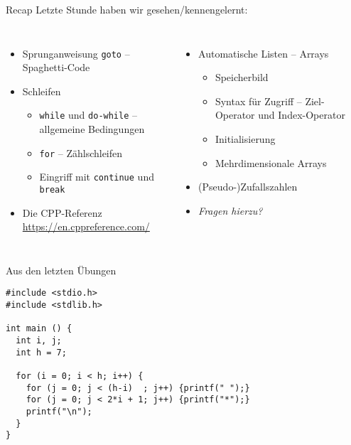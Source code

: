 
\begin{frame}[t,plain]
\titlepage
\end{frame}


\begin{frame}{Recap}
%
Letzte Stunde haben wir gesehen/kennengelernt:
%
\begin{columns}[T]
\begin{itemize}
\item Sprunganweisung \texttt{goto} -- Spaghetti-Code
\item Schleifen
	\begin{itemize}
	\item \texttt{while} und \texttt{do-while} -- allgemeine Bedingungen
	\item \texttt{for} -- Zählschleifen
	\item Eingriff mit \texttt{continue} und \texttt{break}
	\end{itemize}
\item Die CPP-Referenz \url{https://en.cppreference.com/}
\end{itemize}
%
\begin{itemize}
\item Automatische Listen -- Arrays
	\begin{itemize}
	\item Speicherbild
	\item Syntax für Zugriff -- Ziel-Operator und Index-Operator
	\item Initialisierung
	\item Mehrdimensionale Arrays
	\end{itemize}
\item (Pseudo-)Zufallszahlen
\item \emph{Fragen hierzu?}
\end{itemize}
\end{columns}
%
\end{frame}


\begin{frame}[fragile]{Aus den letzten Übungen}
%
\begin{codebox}
\begin{verbatim}
#include <stdio.h>
#include <stdlib.h>

int main () {
  int i, j;
  int h = 7;
  
  for (i = 0; i < h; i++) {
    for (j = 0; j < (h-i)  ; j++) {printf(" ");}
    for (j = 0; j < 2*i + 1; j++) {printf("*");}
    printf("\n");
  }
}
\end{verbatim}
\end{codebox}
%
\end{frame}


